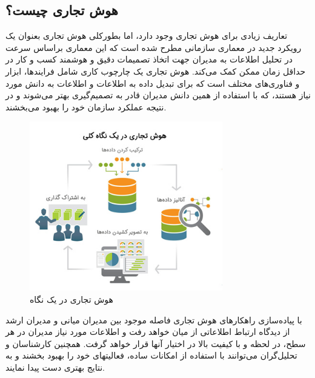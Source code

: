 \documentclass{llncs}
\begin{document}
\subsection{هوش تجاری چیست؟}
تعاریف زیادی برای هوش تجاری وجود دارد، اما بطورکلی هوش تجاری بعنوان یک رویکرد جدید در معماری سازمانی مطرح شده است که این معماری براساس سرعت در تحلیل اطلاعات به مدیران جهت اتخاذ تصمیمات دقیق و هوشمند کسب و کار در حداقل زمان ممکن کمک می‌کند. هوش تجاری یک چارچوب کاری شامل فرایندها، ابزار و فناوری‌های مختلف است که برای تبدیل داده به اطلاعات و اطلاعات به دانش مورد نیاز هستند، که با استفاده از همین دانش مدیران قادر به تصمیم‌گیری بهتر می‌شوند و در نتیجه عملکرد سازمان خود را بهبود می‌بخشند.

\begin{figure}
\centering
\includegraphics[width=0.75\textwidth]{mahi/bi-1.jpg}
\centering
\caption{هوش تجاری در یک نگاه}
\label{fig:ReportedVariables}
\end{figure}


با پیاده‌سازی راهکارهای هوش تجاری فاصله موجود بین مدیران میانی و مدیران ارشد از دیدگاه ارتباط اطلاعاتی از میان خواهد رفت و اطلاعات مورد نیاز مدیران در هر سطح، در لحظه و با کیفیت بالا در اختیار آنها قرار خواهد گرفت. همچنین کارشناسان و تحلیل‌گران می‌توانند با استفاده از امکانات ساده، فعالیتهای خود را بهبود بخشند و به نتایج بهتری دست پیدا نمایند.
\end{document}
